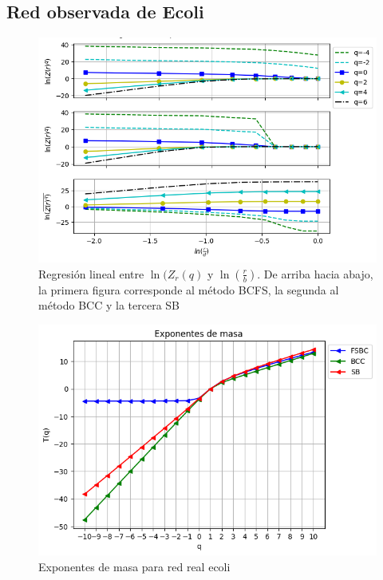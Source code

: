 \subsection{Red observada de Ecoli}

\begin{figure}[H]
    \centering
    \includegraphics[scale=0.7]{Capitulo4Multifractalidad/imagenes/a_TqLnrBCecoli.png}
    \caption{Regresión lineal entre $\ln(Z_r(q)$ y $\ln(\frac{r}{b})$. De arriba hacia abajo, la primera figura corresponde al método BCFS, la segunda al método BCC y la tercera SB}
\end{figure}

\begin{figure}[H]
    \centering
    \includegraphics[scale=0.7]{Capitulo4Multifractalidad/imagenes/a_Tqecoli.png}
    \caption{Exponentes de masa para red real ecoli}
\end{figure}

